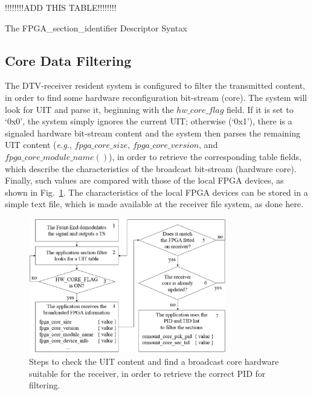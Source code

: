 \begin{table}[ht]
\renewcommand{\arraystretch}{1}
\footnotesize{ !!!!!!!!ADD THIS TABLE!!!!!!!! }
\caption{The FPGA\_section\_identifier Descriptor Syntax}
\label{table:table-six}
\end{table}


\subsection{Core Data Filtering}
\label{core-data}

The DTV-receiver resident system is configured to filter the transmitted content, in order to find some hardware reconfiguration bit-stream (core). The system will look for UIT and parse it, beginning with the $hw\_core\_flag$ field. If it is set to `0x0', the system simply ignores the current UIT; otherwise (`0x1'), there is a signaled hardware bit-stream content and the system then parses the remaining UIT content ({\em e.g.}, $fpga\_core\_size$, $fpga\_core\_version$, and $fpga\_core\_module\_name()$), in order to retrieve the corresponding table fields, which describe the characteristics of the broadcast bit-stream (hardware core). Finally, such values are compared with those of the local FPGA devices, as shown in Fig.~\ref{figure:fig6}. The characteristics of the local FPGA devices can be stored in a simple text file, which is made available at the receiver file system, as done here.

%
\begin{figure}[ht]
\centering
\includegraphics[width=3.4in]{images/Fig6.eps}
\caption{Steps to check the UIT content and find a broadcast core hardware suitable for the receiver, in order to retrieve the correct PID for filtering.}
\label{figure:fig6}
\end{figure}
%

